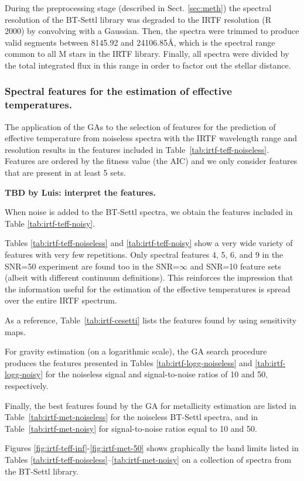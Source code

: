 
During the preprocessing stage (described in Sect. \ref{sec:meth}) the
spectral resolution of the BT-Settl library was degraded to the IRTF
resolution (R ~ 2000) by convolving with a Gaussian. Then, the spectra
were trimmed to produce valid segments between 8145.92 and
24106.85{\AA}, which is the spectral range common to all M stars in
the IRTF library. Finally, all spectra were divided by the total
integrated flux in this range in order to factor out the stellar
distance.

\subsubsection{Spectral features for the estimation of effective temperatures.}

The application of the GAs to the selection of features for the
prediction of effective temperature from noiseless spectra with the
IRTF wavelength range and resolution results in the features included
in Table~\ref{tab:irtf-teff-noiseless}. Features are ordered by the
fitness value (the AIC) and we only consider features that are present
in at least 5 sets.

{\bf TBD by Luis: interpret the features.}

When noise is added to the BT-Settl spectra, we obtain the features
included in Table \ref{tab:irtf-teff-noisy}.


Tables \ref{tab:irtf-teff-noiseless} and \ref{tab:irtf-teff-noisy}
show a very wide variety of features with very few repetitions. Only
spectral features 4, 5, 6, and 9 in the SNR=50 experiment are found
too in the SNR=$\infty$ and SNR=10 feature sets (albeit with different
continuum definitions). This reinforces the impression that the
information useful for the estimation of the effective temperatures is
spread over the entire IRTF spectrum.

As a reference, Table~\ref{tab:irtf-cesetti} lists the features found
by \cite{cesetti} using sensitivity maps.

For gravity estimation (on a logarithmic scale), the GA search
procedure produces the features presented in
Tables \ref{tab:irtf-logg-noiseless} and \ref{tab:irtf-logg-noisy} for
the noiseless signal and signal-to-noise ratios of 10 and 50,
respectively.

Finally, the best features found by the GA for metallicity estimation
are listed in Table~\ref{tab:irtf-met-noiseless} for the noiseless BT-Settl
spectra, and in Table~\ref{tab:irtf-met-noisy} for signal-to-noise
ratios equal to 10 and 50.

Figures \ref{fig:irtf-teff-inf}-\ref{fig:irtf-met-50} shows
graphically the band limits listed in
Tables \ref{tab:irtf-teff-noiseless}--\ref{tab:irtf-met-noisy} on a
collection of spectra from the BT-Settl library.


